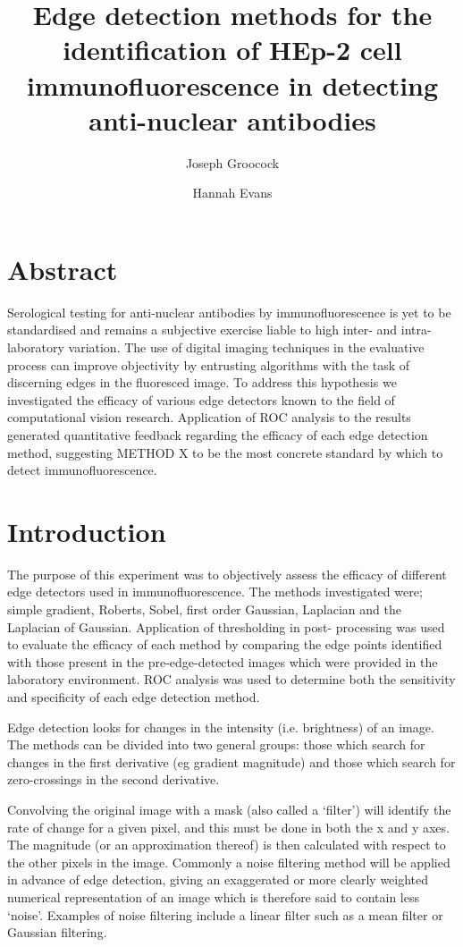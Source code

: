 \documentclass{article}
\title {\vspace{-3ex}Edge detection methods for the identification of HEp-2 cell immunofluorescence in detecting anti-nuclear antibodies}
\author {Joseph Groocock \and Hannah Evans}
\begin{document}
\maketitle

\section{Abstract}

Serological testing for anti-nuclear antibodies by immunofluorescence is yet to be standardised and remains a subjective exercise liable to high inter- and intra-laboratory variation. The use of digital imaging techniques in the evaluative process can improve objectivity by entrusting algorithms with the task of discerning edges in the fluoresced image. To address this hypothesis we investigated the efficacy of various edge detectors known to the field of computational vision research. Application of ROC analysis to the results generated quantitative feedback regarding the efficacy of each edge detection method, suggesting METHOD X to be the most concrete standard by which to detect immunofluorescence.

\section{Introduction}

The purpose of this experiment was to objectively assess the efficacy of different edge detectors used in immunofluorescence. The methods investigated were; simple gradient, Roberts, Sobel, first order Gaussian, Laplacian and the Laplacian of Gaussian. Application of thresholding in post- processing was used to evaluate the efficacy of each method by comparing the edge points identified with those present in the pre-edge-detected images which were provided in the laboratory environment. ROC analysis was used to determine both the sensitivity and specificity of each edge detection method. 

Edge detection looks for changes in the intensity (i.e. brightness) of an image. The methods can be divided into two general groups: those which search for changes in the first derivative (eg gradient magnitude) and those which search for zero-crossings in the second derivative. 

Convolving the original image with a mask (also called a ‘filter’) will identify the rate of change for a given pixel, and this must be done in both the x and y axes. The magnitude (or an approximation thereof) is then calculated with respect to the other pixels in the image. Commonly a noise filtering method will be applied in advance of edge detection, giving an exaggerated or more clearly weighted numerical representation of an image which is therefore said to contain less ‘noise’. Examples of noise filtering include a linear filter such as a mean filter or Gaussian filtering.
\end{document}
